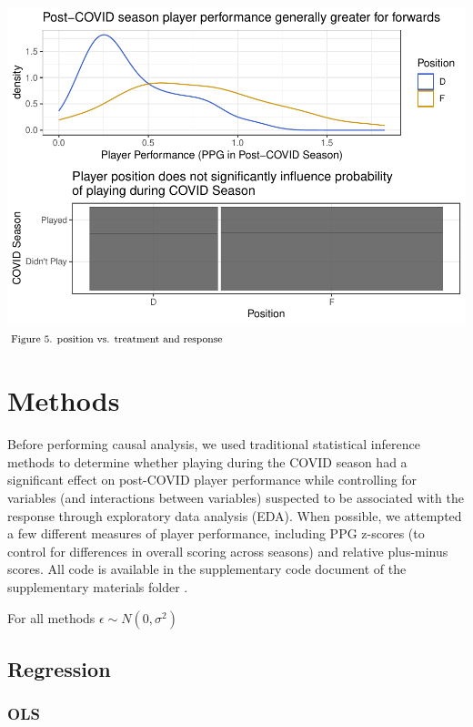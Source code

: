 \documentclass[12pt]{article}
\begin{document}
\includegraphics{journal-article_files/figure-latex/pos-plots-1.pdf}
\(\hspace*{\fill} \footnotesize \text{Figure 5. position vs. treatment and response}\)

\hypertarget{methods}{%
\section{Methods}\label{methods}}

Before performing causal analysis, we used traditional statistical
inference methods to determine whether playing during the COVID season
had a significant effect on post-COVID player performance while
controlling for variables (and interactions between variables) suspected
to be associated with the response through exploratory data analysis
(EDA). When possible, we attempted a few different measures of player
performance, including PPG z-scores (to control for differences in
overall scoring across seasons) and relative plus-minus scores. All code
is available in the supplementary code document of the supplementary
materials folder \citet{sezgin}.

For all methods \(\epsilon \sim N(0, \sigma^2)\)

\hypertarget{regression}{%
\subsection{Regression}\label{regression}}

\hypertarget{ols}{%
\subsubsection{OLS}\label{ols}}
\end{document}
